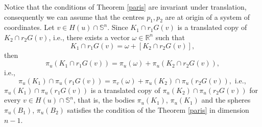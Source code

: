 \documentclass[12pt]{amsart}
\newcommand{\Rn}{\mathbb{R}^{n}}
\begin{document}
Notice that the conditions of Theorem \ref{paris} are invariant under translation, consequently we can assume that the centres $p_1,p_2$ are at origin of a system of coordinates. Let $v\in H(u)\cap \mathbb{S}^{n}$. Since $K_1\cap r_1G(v)$ is a translated copy of  $K_2\cap r_2G(v)$, i.e., there exists a vector $\omega \in \Rn$ such that
\[
K_1\cap r_1G(v)= \omega + [K_2\cap r_2G(v)],
\]
then 
\[
\pi_u(K_1\cap r_1G(v)) =\pi_u(\omega) + \pi_u(K_2\cap r_2G(v)),\]
 i.e., 
\[
\pi_u(K_1)\cap  \pi_u(r_1G(v)) =\pi_v(\omega) + \pi_u(K_2)\cap   \pi_u(r_2G(v)), \textrm{ i.e.},
\]
$\pi_u(K_1)\cap \pi_u(r_1G(v))$ is a translated copy of $\pi_u(K_2)\cap \pi_u(r_2G(v))$ for every $v\in H(u)\cap \mathbb{S}^{n}$, that is, the bodies $\pi_u(K_1)$, $\pi_u(K_1)$ and the spheres $\pi_u(B_1)$, $\pi_u(B_2)$ satisfies the condition of the Theo\-rem \ref{paris} in dimension $n-1$.
\end{document}
